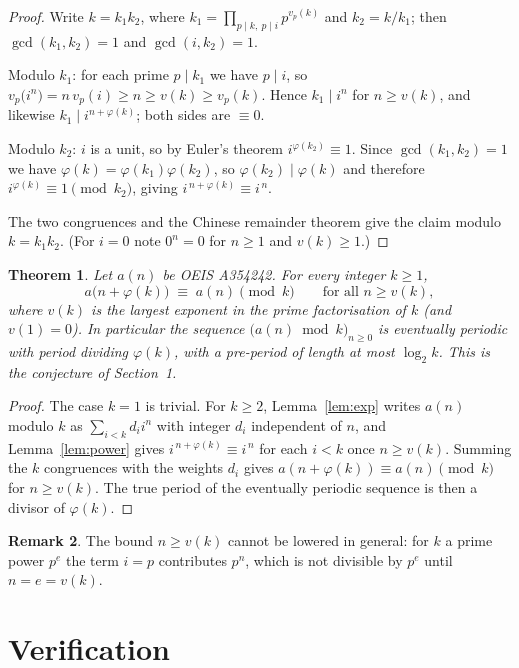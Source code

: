\documentclass[11pt,a4paper]{article}
\theoremstyle{plain}
\newtheorem{theorem}{Theorem}
\theoremstyle{definition}
\newtheorem{remark}[theorem]{Remark}
\begin{document}
\begin{proof}
Write $k=k_1k_2$, where $k_1=\prod_{p\mid k,\ p\mid i}p^{v_p(k)}$ and $k_2=k/k_1$; then
$\gcd(k_1,k_2)=1$ and $\gcd(i,k_2)=1$.

Modulo $k_1$: for each prime $p\mid k_1$ we have $p\mid i$, so
$v_p\bigl(i^{n}\bigr)=n\,v_p(i)\ge n\ge v(k)\ge v_p(k)$. Hence $k_1\mid i^{n}$ for
$n\ge v(k)$, and likewise $k_1\mid i^{n+\varphi(k)}$; both sides are $\equiv 0$.

Modulo $k_2$: $i$ is a unit, so by Euler's theorem $i^{\varphi(k_2)}\equiv 1$. Since
$\gcd(k_1,k_2)=1$ we have $\varphi(k)=\varphi(k_1)\varphi(k_2)$, so
$\varphi(k_2)\mid\varphi(k)$ and therefore $i^{\varphi(k)}\equiv 1 \pmod{k_2}$, giving
$i^{\,n+\varphi(k)}\equiv i^{\,n}$.

The two congruences and the Chinese remainder theorem give the claim modulo $k=k_1k_2$.
(For $i=0$ note $0^{n}=0$ for $n\ge 1$ and $v(k)\ge1$.)
\end{proof}

\begin{theorem}\label{thm:main}
Let $a(n)$ be OEIS A354242. For every integer $k\ge1$,
\[
a\bigl(n+\varphi(k)\bigr)\;\equiv\;a(n)\pmod{k}\qquad\text{for all } n\ge v(k),
\]
where $v(k)$ is the largest exponent in the prime factorisation of $k$ (and $v(1)=0$).
In particular the sequence $\bigl(a(n)\bmod k\bigr)_{n\ge0}$ is eventually periodic with
period dividing $\varphi(k)$, with a pre-period of length at most $\log_2 k$. This is the
conjecture of Section~1.
\end{theorem}

\begin{proof}
The case $k=1$ is trivial. For $k\ge2$, Lemma~\ref{lem:exp} writes $a(n)$ modulo $k$ as
$\sum_{i<k}d_i i^{n}$ with integer $d_i$ independent of $n$, and Lemma~\ref{lem:power}
gives $i^{\,n+\varphi(k)}\equiv i^{\,n}$ for each $i<k$ once $n\ge v(k)$. Summing the
$k$ congruences with the weights $d_i$ gives
$a(n+\varphi(k))\equiv a(n)\pmod k$ for $n\ge v(k)$. The true period of the eventually
periodic sequence is then a divisor of $\varphi(k)$.
\end{proof}

\begin{remark}
The bound $n\ge v(k)$ cannot be lowered in general: for $k$ a prime power $p^{e}$ the
term $i=p$ contributes $p^{n}$, which is not divisible by $p^{e}$ until $n=e=v(k)$.
\end{remark}

\section{Verification}
\end{document}
